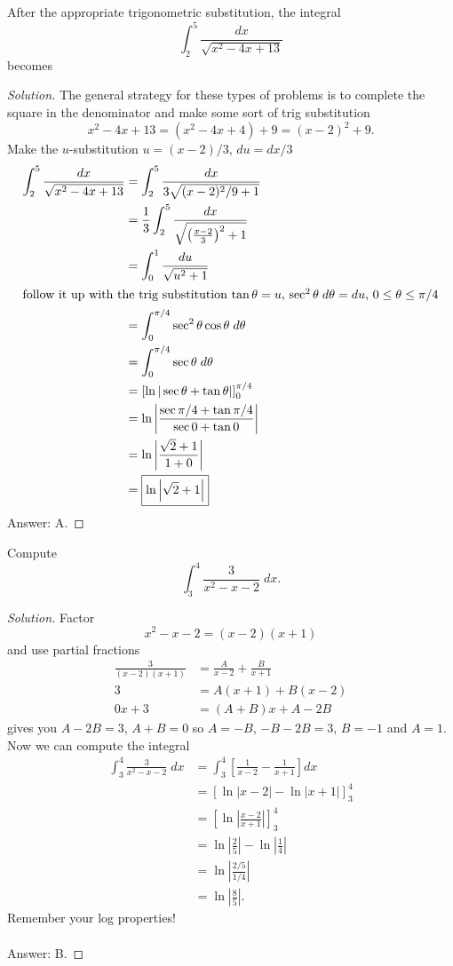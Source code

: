 \begin{problem}
After the appropriate trigonometric substitution, the integral
\[
\int_2^5\frac{dx}{\sqrt{x^2-4x+13}}
\]
becomes
\end{problem}
\begin{proof}[Solution]
The general strategy for these types of problems is to complete the square
in the denominator and make some sort of trig substitution
\[
x^2-4x+13=
\left(x^2-4x+4\right)+9=
(x-2)^2+9.
\]
Make the $u$-substitution $u=(x-2)/3$, $du=dx/3$
\begin{align*}
\int_2^5\frac{dx}{\sqrt{x^2-4x+13}}
&=\int_2^5\frac{dx}{3\sqrt{(x-2)^2/9+1}}\\
&=\frac{1}{3}\int_2^5\frac{dx}{\sqrt{\left(\frac{x-2}{3}\right)^2+1}}\\
&=\int_0^1\frac{du}{\sqrt{u^2+1}}\\
\intertext{follow it up with the trig substitution $\tan\theta=u$,
  $\sec^2\theta\;d\theta=du$, $0\leq\theta\leq\pi/4$}
&=\int_0^{\pi/4}\sec^2\theta\cos\theta\;d\theta\\
&=\int_0^{\pi/4}\sec\theta\;d\theta\\
&=\left[\ln|\sec\theta+\tan\theta|\right]_0^{\pi/4}\\
&=\ln\left|\frac{\sec\pi/4+\tan\pi/4}{\sec 0+\tan 0}\right|\\
&=\ln\left|\frac{\sqrt{2}+1}{1+0}\right|\\
&=\boxed{\ln\left|\sqrt{2}+1\right|}
\end{align*}
Answer: A.
\end{proof}
\begin{problem}
Compute
\[
\int_3^4\frac{3}{x^2-x-2}\;dx.
\]
\end{problem}
\begin{proof}[Solution]
Factor
\[
x^2-x-2=(x-2)(x+1)
\]
and use partial fractions
\begin{align*}
\frac{3}{(x-2)(x+1)}&=\frac{A}{x-2}+\frac{B}{x+1}\\
3&=A(x+1)+B(x-2)\\
0x+3&=(A+B)x+A-2B
\end{align*}
gives you $A-2B=3$, $A+B=0$ so $A=-B$, $-B-2B=3$, $B=-1$ and $A=1$. Now we
can compute the integral
\begin{align*}
\int_3^4\frac{3}{x^2-x-2}\;dx
&=\int_3^4\left[\frac{1}{x-2}-\frac{1}{x+1}\right]dx\\
&=\left[\ln|x-2|-\ln|x+1|\right]_3^4\\
&=\left[\ln\left|\frac{x-2}{x+1}\right|\right]_3^4\\
&=\ln\left|\frac{2}{5}\right|-\ln\left|\frac{1}{4}\right|\\
&=\ln\left|\frac{2/5}{1/4}\right|\\
&=\boxed{\ln\left|\frac{8}{5}\right|.}
\end{align*}
Remember your log properties!
\\\\
Answer: B.
\end{proof}

